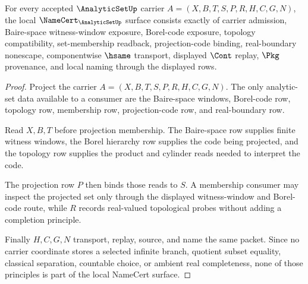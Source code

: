 \begin{theorem}
\label{thm:analytic-set-namecert-obligations}
For every accepted $\AnalyticSetUp$ carrier $A=(X,B,T,S,P,R,H,C,G,N)$, the local $\NameCert_{\AnalyticSetUp}$ surface consists exactly of carrier admission, Baire-space witness-window exposure, Borel-code exposure, topology compatibility, set-membership readback, projection-code binding, real-boundary nonescape, componentwise $\hsame$ transport, displayed $\Cont$ replay, $\Pkg$ provenance, and local naming through the displayed rows.
\end{theorem}
\begin{proof}
Project the carrier $A=(X,B,T,S,P,R,H,C,G,N)$. The only analytic-set data available to a consumer are the Baire-space windows, Borel-code row, topology row, membership row, projection-code row, and real-boundary row.

Read $X,B,T$ before projection membership. The Baire-space row supplies finite witness windows, the Borel hierarchy row supplies the code being projected, and the topology row supplies the product and cylinder reads needed to interpret the code.

The projection row $P$ then binds those reads to $S$. A membership consumer may inspect the projected set only through the displayed witness-window and Borel-code route, while $R$ records real-valued topological probes without adding a completion principle.

Finally $H,C,G,N$ transport, replay, source, and name the same packet. Since no carrier coordinate stores a selected infinite branch, quotient subset equality, classical separation, countable choice, or ambient real completeness, none of those principles is part of the local NameCert surface.
\end{proof}


